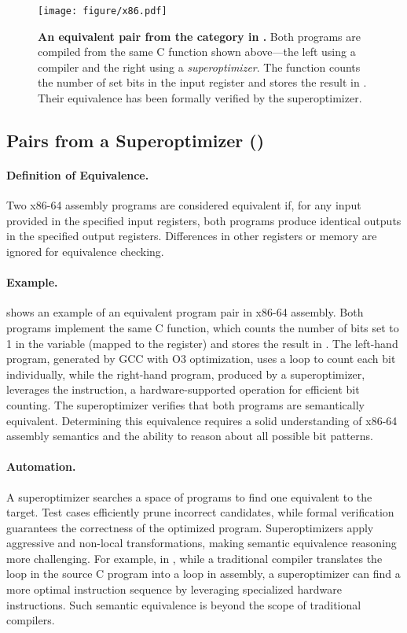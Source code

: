 \begin{figure}[!tb]
\centering
\texttt{[image: figure/x86.pdf]}
\caption{\textbf{An equivalent pair from the \ass category in \name.} Both programs are compiled from the same C function shown above—the left using a compiler and the right using a \emph{superoptimizer}. The function counts the number of set bits in the input  register and stores the result in . Their equivalence has been formally verified by the superoptimizer.}
\label{fig:x86}
\end{figure}

\subsection{Pairs from a Superoptimizer (\ass)}
\label{subsec:x86}

\paragraph{Definition of Equivalence.} Two x86-64 assembly programs are considered equivalent if, for any input provided in the specified input registers, both programs produce identical outputs in the specified output registers. Differences in other registers or memory are ignored for equivalence checking.

\paragraph{Example.}  shows an example of an equivalent program pair in x86-64 assembly. Both programs implement the same C function, which counts the number of bits set to 1 in the variable  (mapped to the  register) and stores the result in . The left-hand program, generated by GCC with O3 optimization, uses a loop to count each bit individually, while the right-hand program, produced by a superoptimizer, leverages the  instruction, a hardware-supported operation for efficient bit counting. The superoptimizer verifies that both programs are semantically equivalent. Determining this equivalence requires a solid understanding of x86-64 assembly semantics and the ability to reason about all possible bit patterns.

\paragraph{Automation.} A superoptimizer searches a space of programs to find one equivalent to the target. Test cases efficiently prune incorrect candidates, while formal verification guarantees the correctness of the optimized program. Superoptimizers apply aggressive and non-local transformations, making semantic equivalence reasoning more challenging. For example, in , while a traditional compiler translates the loop in the source C program into a loop in assembly, a superoptimizer can find a more optimal instruction sequence by leveraging specialized hardware instructions. Such semantic equivalence is beyond the scope of traditional compilers.

